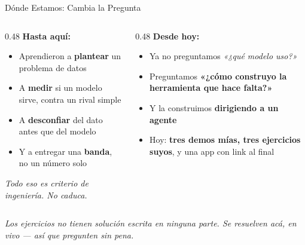\documentclass[aspectratio=169, 11pt]{beamer}
\begin{document}
\begin{frame}[shrink=5]{Dónde Estamos: Cambia la Pregunta}
  \vspace{-2pt}
  \begin{columns}[T]
    \begin{column}{0.48\textwidth}
      {\small\color{arcaDark}\bfseries\faCheckCircle\hspace{5pt}Hasta aquí:}
      \vspace{4pt}
      {\footnotesize\color{textMuted}
      \begin{itemize}\setlength{\itemsep}{4pt}
        \item[{\color{codeGreen}\scriptsize\faCheck}]
          Aprendieron a \textbf{plantear} un problema de datos
        \item[{\color{codeGreen}\scriptsize\faCheck}]
          A \textbf{medir} si un modelo sirve, contra un rival simple
        \item[{\color{codeGreen}\scriptsize\faCheck}]
          A \textbf{desconfiar} del dato antes que del modelo
        \item[{\color{codeGreen}\scriptsize\faCheck}]
          Y a entregar una \textbf{banda}, no un número solo
      \end{itemize}}
      \vspace{4pt}
      {\scriptsize\color{textMuted}\itshape
       Todo eso es criterio de ingeniería. No caduca.}
    \end{column}
    \begin{column}{0.48\textwidth}
      {\small\color{arcaDark}\bfseries\faForward\hspace{5pt}Desde hoy:}
      \vspace{4pt}
      {\footnotesize\color{textMuted}
      \begin{itemize}\setlength{\itemsep}{4pt}
        \item[{\color{arcaRed}\scriptsize\faArrowRight}]
          Ya no preguntamos \emph{«¿qué modelo uso?»}
        \item[{\color{arcaRed}\scriptsize\faArrowRight}]
          Preguntamos \textbf{«¿cómo construyo la herramienta que hace
          falta?»}
        \item[{\color{arcaRed}\scriptsize\faArrowRight}]
          Y la construimos \textbf{dirigiendo a un agente}
        \item[{\color{arcaRed}\scriptsize\faStar}]
          Hoy: \textbf{tres demos mías, tres ejercicios suyos}, y una app
          con link al final
      \end{itemize}}
    \end{column}
  \end{columns}
  \vspace{4pt}
  {\scriptsize\color{arcaDark}\itshape
   Los ejercicios no tienen solución escrita en ninguna parte. Se resuelven
   acá, en vivo --- así que pregunten sin pena.}
\end{frame}
\end{document}
